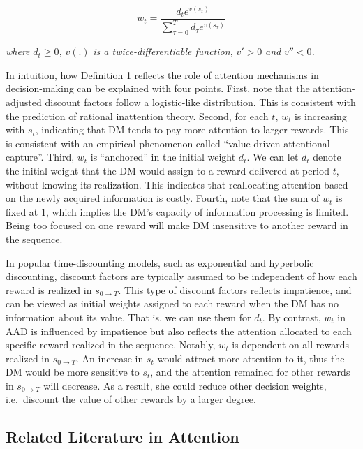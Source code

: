 \documentclass[
  12pt,
]{article}
\begin{document}
\[\tag{1}
w_t = \frac{d_te^{v(s_t)}}{\sum_{\tau=0}^T d_\tau e^{v(s_\tau)}} 
\]

\emph{where} \(d_t \geq 0\)\emph{,} \(v(.)\) \emph{is a
twice-differentiable function,} \(v'>0\) \emph{and} \(v''<0\)\emph{.}

In intuition, how Definition 1 reflects the role of attention mechanisms
in decision-making can be explained with four points. First, note that
the attention-adjusted discount factors follow a logistic-like
distribution. This is consistent with the prediction of rational
inattention theory. Second, for each \(t\), \(w_t\) is increasing with
\(s_t\), indicating that DM tends to pay more attention to larger
rewards. This is consistent with an empirical phenomenon called
``value-driven attentional capture''. Third, \(w_t\) is ``anchored'' in
the initial weight \(d_t\). We can let \(d_t\) denote the initial weight
that the DM would assign to a reward delivered at period \(t\), without
knowing its realization. This indicates that reallocating attention
based on the newly acquired information is costly. Fourth, note that the
sum of \(w_t\) is fixed at 1, which implies the DM's capacity of
information processing is limited. Being too focused on one reward will
make DM insensitive to another reward in the sequence.

In popular time-discounting models, such as exponential and hyperbolic
discounting, discount factors are typically assumed to be independent of
how each reward is realized in \(s_{0\rightarrow T}\). This type of
discount factors reflects impatience, and can be viewed as initial
weights assigned to each reward when the DM has no information about its
value. That is, we can use them for \(d_t\). By contrast, \(w_t\) in AAD
is influenced by impatience but also reflects the attention allocated to
each specific reward realized in the sequence. Notably, \(w_t\) is
dependent on all rewards realized in \(s_{0\rightarrow T}\). An increase
in \(s_t\) would attract more attention to it, thus the DM would be more
sensitive to \(s_t\), and the attention remained for other rewards in
\(s_{0\rightarrow T}\) will decrease. As a result, she could reduce
other decision weights, i.e.~discount the value of other rewards by a
larger degree.

\hypertarget{related-literature-in-attention}{%
\subsection{Related Literature in
Attention}\label{related-literature-in-attention}}
\end{document}
